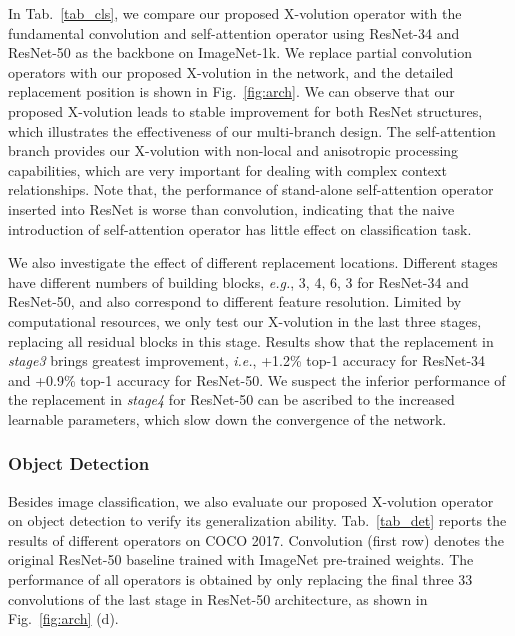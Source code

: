 \documentclass{article}
\begin{document}
In Tab.~\ref{tab_cls}, we compare our proposed X-volution operator with the fundamental convolution and self-attention operator using ResNet-34 and ResNet-50 as the backbone on ImageNet-1k. 
We replace partial convolution operators with our proposed X-volution in the network, and the detailed replacement position is shown in Fig.~\ref{fig:arch}.
We can observe that our proposed X-volution leads to stable improvement for both ResNet structures, which illustrates the effectiveness of our multi-branch design. The self-attention branch provides our X-volution with non-local and anisotropic processing capabilities, which are very important for dealing with complex context relationships.
Note that, the performance of stand-alone self-attention operator inserted into ResNet is worse than convolution, indicating that the naive introduction of self-attention operator has little effect on classification task.

We also investigate the effect of different replacement locations. 
Different stages have different numbers of building blocks, \emph{e.g.}, 3, 4, 6, 3 for ResNet-34 and ResNet-50, and also correspond to different feature resolution. 
Limited by computational resources, 
we only test our X-volution in the last three stages, replacing all residual blocks in this stage. 
Results show that the replacement in \textit{stage3} brings greatest improvement, \emph{i.e.}, +1.2\% top-1 accuracy for ResNet-34 and +0.9\% top-1 accuracy for ResNet-50. 
We suspect the inferior performance of the replacement in \textit{stage4} for ResNet-50 can be ascribed to the increased learnable parameters, which slow down the convergence of the network.





\subsubsection{Object Detection}
Besides image classification, we also evaluate our proposed X-volution operator on object detection to verify its generalization ability. Tab.~\ref{tab_det} reports the results of different operators on COCO 2017. 
Convolution (first row) denotes the original ResNet-50 baseline trained with ImageNet pre-trained weights. 
The performance of all operators is obtained by only replacing the final three 33 convolutions of the last stage in ResNet-50 architecture, as shown in Fig.~\ref{fig:arch} (d). 
\end{document}
